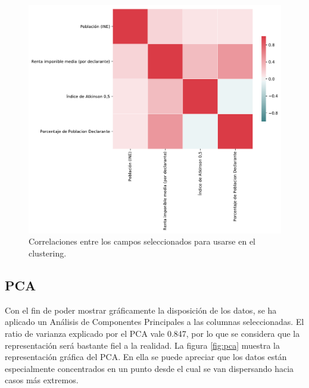\documentclass[acmtog, screen]{acmart}
\begin{document}
\begin{figure}
	\includegraphics[width=\columnwidth]{Correlaciones2}
	\caption{Correlaciones entre los campos seleccionados para usarse en el clustering.}
	\label{fig:correlaciones2}
\end{figure}

\subsection{PCA}
Con el fin de poder mostrar gráficamente la disposición de los datos, se ha aplicado un Análisis de Componentes Principales a las columnas seleccionadas. El ratio de varianza explicado por el PCA vale 0.847, por lo que se considera que la representación será bastante fiel a la realidad. La figura \ref{fig:pca} muestra la representación gráfica del PCA. En ella se puede apreciar que los datos están especialmente concentrados en un punto desde el cual se van dispersando hacia casos más extremos.
\end{document}
